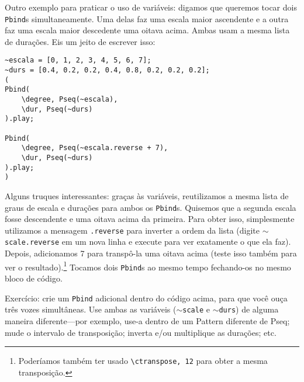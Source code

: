 Outro exemplo para praticar o uso de variáveis: digamos que queremos tocar dois \texttt{Pbind}s simultaneamente. Uma delas faz uma escala maior ascendente e a outra faz uma escala maior descedente uma oitava acima. Ambas usam a mesma lista de durações. Eis um jeito de escrever isso:

\begin{lstlisting}[style=SuperCollider-IDE, basicstyle=\scttfamily\footnotesize]
~escala = [0, 1, 2, 3, 4, 5, 6, 7];
~durs = [0.4, 0.2, 0.2, 0.4, 0.8, 0.2, 0.2, 0.2];
(
Pbind(
	\degree, Pseq(~escala),
	\dur, Pseq(~durs)
).play;

Pbind(
	\degree, Pseq(~escala.reverse + 7),
	\dur, Pseq(~durs)
).play;
)
\end{lstlisting}
 
Alguns truques interessantes: graças às variáveis, reutilizamos a mesma lista de graus de escala e durações para ambos os \texttt{Pbind}s. Quisemos que a segunda escala fosse descendente e uma oitava acima da primeira. Para obter isso, simplesmente utilizamos a mensagem \texttt{.reverse} para inverter a ordem da lista (digite \texttt{$\sim$scale.reverse} em um nova linha e execute para ver exatamente o que ela faz). Depois, adicionamos 7 para transpô-la uma oitava acima (teste isso também para ver o resultado).\footnote{Poderíamos também ter usado \texttt{\textbackslash ctranspose, 12} para obter a mesma transposição.} Tocamos dois \texttt{Pbind}s ao mesmo tempo fechando-os no mesmo bloco de código.

Exercício: crie um \texttt{Pbind} adicional dentro do código acima, para que você ouça três vozes simultâneas. Use ambas as variáveis (\texttt{$\sim$scale} e \texttt{$\sim$durs}) de alguma maneira diferente---por exemplo, use-a dentro de um Pattern diferente de Pseq; mude o intervalo de transposição; inverta e/ou multiplique as durações; etc.
